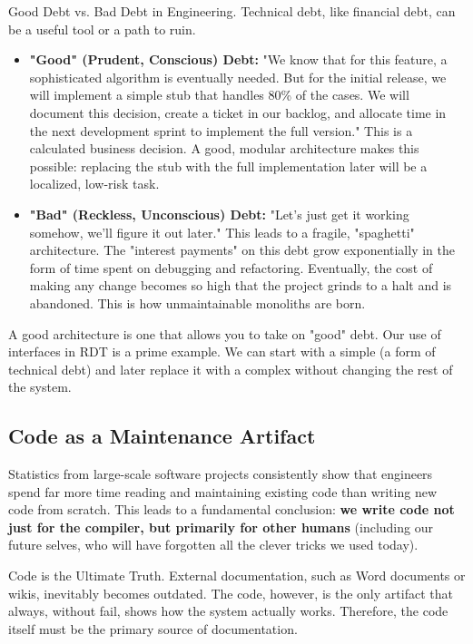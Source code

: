\begin{principlebox}{Good Debt vs. Bad Debt in Engineering.}
    Technical debt, like financial debt, can be a useful tool or a path to ruin.
    \begin{itemize}
        \item \textbf{"Good" (Prudent, Conscious) Debt:} "We know that for this feature, a sophisticated algorithm is eventually needed. But for the initial release, we will implement a simple stub that handles 80\% of the cases. We will document this decision, create a ticket in our backlog, and allocate time in the next development sprint to implement the full version." This is a calculated business decision. A good, modular architecture makes this possible: replacing the stub with the full implementation later will be a localized, low-risk task.
        \item \textbf{"Bad" (Reckless, Unconscious) Debt:} "Let's just get it working somehow, we'll figure it out later." This leads to a fragile, "spaghetti" architecture. The "interest payments" on this debt grow exponentially in the form of time spent on debugging and refactoring. Eventually, the cost of making any change becomes so high that the project grinds to a halt and is abandoned. This is how unmaintainable monoliths are born.
    \end{itemize}
    A good architecture is one that allows you to take on "good" debt. Our use of interfaces in RDT is a prime example. We can start with a simple  (a form of technical debt) and later replace it with a complex  without changing the rest of the system.
\end{principlebox}

\subsection{Code as a Maintenance Artifact}
\label{subsec:code_for_maintenance}

Statistics from large-scale software projects consistently show that engineers spend far more time reading and maintaining existing code than writing new code from scratch. This leads to a fundamental conclusion: \textbf{we write code not just for the compiler, but primarily for other humans} (including our future selves, who will have forgotten all the clever tricks we used today).

\begin{tipbox}{Code is the Ultimate Truth.}
    External documentation, such as Word documents or wikis, inevitably becomes outdated. The code, however, is the only artifact that always, without fail, shows how the system actually works. Therefore, the code itself must be the primary source of documentation.
\end{tipbox}

